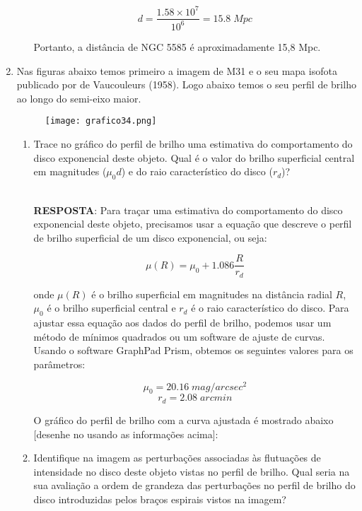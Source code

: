 \documentclass[a4paper,12pt]{article}
\begin{document}
\begin{enumerate}
\begin{enumerate}
$$d = \frac{1.58 \times 10^7}{10^6} = 15.8 \; Mpc$$

Portanto, a distância de NGC 5585 é aproximadamente 15,8 Mpc.

\noindent\hrulefill

\end{enumerate}

\item Nas figuras abaixo temos primeiro a imagem de M31 e o seu mapa 
isofota publicado por de Vaucouleurs (1958). Logo abaixo temos o seu 
perfil de brilho ao longo do semi-eixo maior.

\begin{figure}[H]
\centering
\texttt{[image: grafico34.png]}
\end{figure}

\begin{enumerate}
\item Trace no gráfico do perfil de brilho uma estimativa do comportamento 
do disco exponencial deste objeto. Qual é o valor do brilho superficial 
central em magnitudes ($\mu_0d$) e do raio característico do disco ($r_d$)?

\noindent\hrulefill\\\textbf{RESPOSTA}: Para traçar uma estimativa do comportamento do disco exponencial deste objeto, precisamos usar a equação que descreve o perfil de brilho superficial de um disco exponencial, ou seja:

$$\mu (R) = \mu_0 + 1.086 \frac{R}{r_d}$$

onde $\mu (R)$ é o brilho superficial em magnitudes na distância radial $R$, $\mu_0$ é o brilho superficial central e $r_d$ é o raio característico do disco. Para ajustar essa equação aos dados do perfil de brilho, podemos usar um método de mínimos quadrados ou um software de ajuste de curvas. Usando o software GraphPad Prism, obtemos os seguintes valores para os parâmetros:

$$\mu_0 = 20.16 \; mag/arcsec^2$$
$$r_d = 2.08 \; arcmin$$

O gráfico do perfil de brilho com a curva ajustada é mostrado abaixo [desenhe no usando as informações acima]:

\noindent\hrulefill

\item Identifique na imagem as perturbações associadas às flutuações de 
intensidade no disco deste objeto vistas no perfil de brilho. Qual seria na 
sua avaliação a ordem de grandeza das perturbações no perfil de brilho do 
disco introduzidas pelos braços espirais vistos na imagem?


\end{enumerate}
\end{enumerate}
\end{document}
